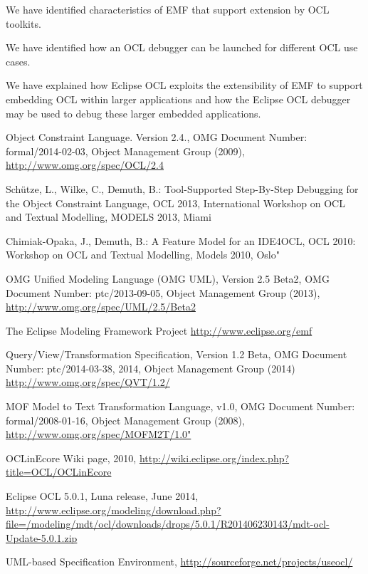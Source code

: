 \documentclass[a4paper]{article}
\begin{document}
We have identified characteristics of EMF that support extension by OCL toolkits.

We have identified how an OCL debugger can be launched for different OCL use cases.

We have explained how Eclipse OCL exploits the extensibility of EMF to support embedding OCL within larger applications and how the Eclipse OCL debugger may be used to debug these larger embedded applications.


% 
%

\begin{thebibliography}{11}

 Object Constraint Language. Version 2.4., OMG Document Number: formal/2014-02-03, Object Management Group (2009),  \url{http://www.omg.org/spec/OCL/2.4}

 Sch\"utze, L., Wilke, C., Demuth, B.: Tool-Supported Step-By-Step Debugging
for the Object Constraint Language, OCL 2013, International Workshop on OCL and Textual Modelling, MODELS 2013, Miami

 Chimiak-Opaka, J., Demuth, B.: A Feature Model for an IDE4OCL, OCL 2010: Workshop on OCL and Textual Modelling, Models 2010, Oslo"

 OMG Unified Modeling Language (OMG UML), Version 2.5 Beta2, {OMG Document Number}: ptc/2013-09-05, Object Management Group (2013), \url{http://www.omg.org/spec/UML/2.5/Beta2}

 The Eclipse Modeling Framework Project \url{http://www.eclipse.org/emf}

 Query/View/Transformation Specification, Version 1.2 Beta, {OMG Document Number}: ptc/2014-03-38, 2014, Object Management Group (2014) \url{http://www.omg.org/spec/QVT/1.2/}

 MOF Model to Text Transformation Language,  v1.0, {OMG Document Number}: formal/2008-01-16, Object Management Group (2008), \url{http://www.omg.org/spec/MOFM2T/1.0"}

 OCLinEcore Wiki page, 2010, \url{http://wiki.eclipse.org/index.php?title=OCL/OCLinEcore}

 Eclipse OCL 5.0.1, Luna release, June 2014, \url{http://www.eclipse.org/modeling/download.php?file=/modeling/mdt/ocl/downloads/drops/5.0.1/R201406230143/mdt-ocl-Update-5.0.1.zip}

 UML-based Specification Environment, \url{http://sourceforge.net/projects/useocl/}

\end{thebibliography}
\end{document}
